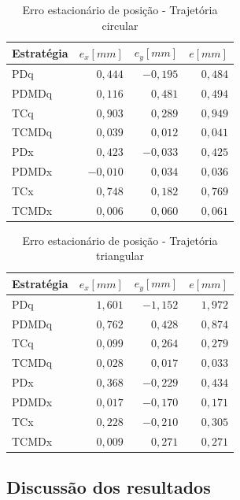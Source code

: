 \documentclass[]{politex}
\begin{document}
\begin{table}[H] 
\centering
\caption{Erro estacionário de posição - Trajetória circular}
\label{tab:valorFinalCirculo}
\begin{tabular}{l|r|r|r}
Estratégia & $e_x [mm]$ & $e_y [mm]$ & $e [mm]$ \\ \hline
PDq        & $ 0{,}444$   & $-0{,}195$   & $0{,}484$  \\
PDMDq      & $ 0{,}116$   & $ 0{,}481$   & $0{,}494$  \\
TCq        & $ 0{,}903$   & $ 0{,}289$   & $0{,}949$  \\
TCMDq      & $ 0{,}039$   & $ 0{,}012$   & $0{,}041$  \\
PDx        & $ 0{,}423$   & $-0{,}033$   & $0{,}425$  \\
PDMDx      & $-0{,}010$   & $ 0{,}034$   & $0{,}036$  \\
TCx        & $ 0{,}748$   & $ 0{,}182$   & $0{,}769$  \\
TCMDx      & $ 0{,}006$   & $ 0{,}060$   & $0{,}061$  \\
\end{tabular}
\end{table}

\begin{table}[H] 
\centering
\caption{Erro estacionário de posição - Trajetória triangular}
\label{tab:valorFinalTriangulo}
\begin{tabular}{l|r|r|r}
Estratégia & $e_x [mm]$ & $e_y [mm]$ & $e [mm]$ \\ \hline
PDq        & $ 1{,}601$   & $-1{,}152$   & $1{,}972$  \\
PDMDq      & $ 0{,}762$   & $ 0{,}428$   & $0{,}874$  \\
TCq        & $ 0{,}099$   & $ 0{,}264$   & $0{,}279$  \\
TCMDq      & $ 0{,}028$   & $ 0{,}017$   & $0{,}033$  \\
PDx        & $ 0{,}368$   & $-0{,}229$   & $0{,}434$  \\
PDMDx      & $ 0{,}017$   & $-0{,}170$   & $0{,}171$  \\
TCx        & $ 0{,}228$   & $-0{,}210$   & $0{,}305$  \\
TCMDx      & $ 0{,}009$   & $ 0{,}271$   & $0{,}271$  \\
\end{tabular}
\end{table}

\subsection{Discussão dos resultados}
\end{document}
